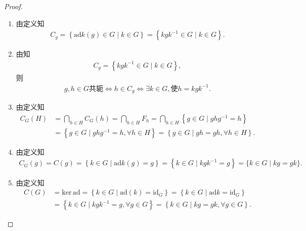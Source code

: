 \documentclass[../../main.tex]{subfiles}%
\begin{document}
\begin{proof}
\begin{enumerate}[(1)]
\item 由定义知
\begin{align*}
C_g=\left\{ \mathrm{ad}k\left( g \right) \in G\mid k\in G \right\} =\left\{ kgk^{-1}\in G\mid k\in G \right\} .
\end{align*}

\item 由知
\begin{align*}
C_g =\left\{ kgk^{-1}\in G\mid k\in G \right\} ,
\end{align*}
则
\begin{align*}
g,h\in G\text{共轭}\Longleftrightarrow h\in C_g\Longleftrightarrow \exists k\in G,\text{使}h=kgk^{-1}.
\end{align*}

\item 由定义知
\begin{align*}
C_G\left( H \right) &=\bigcap_{h\in H}{C_G\left( h \right)}=\bigcap_{h\in H}{F_h}=\bigcap_{h\in H}{\left\{ g\in G\mid ghg^{-1}=h \right\}}\\
&=\left\{ g\in G\mid ghg^{-1}=h,\forall h\in H \right\} =\left\{ g\in G\mid gh=gh,\forall h\in H \right\} .
\end{align*}

\item 由定义知
\begin{align*}
C_G(g)=C(g)=\left\{ k\in G\mid \mathrm{ad}k\left( g \right) =g \right\} =\left\{ k\in G\mid kgk^{-1}=g \right\} =\{k\in G\mid kg=gk\}.
\end{align*}

\item 由定义知
\begin{align*}
C(G)&=\mathrm{ker}\,\mathrm{ad}=\left\{ k\in G\mid \mathrm{ad}\left( k \right) =\mathrm{id}_G \right\} =\left\{ k\in G\mid \mathrm{ad}k=\mathrm{id}_G \right\} 
\\
&=\left\{ k\in G\mid kgk^{-1}=g,\forall g\in G \right\} =\left\{ k\in G\mid kg=gk,\forall g\in G \right\} .
\end{align*}
\end{enumerate}

\end{proof}
\end{document}
